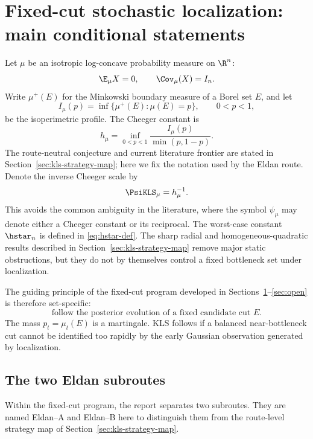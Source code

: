 \documentclass[../../main.tex]{subfiles}
\begin{document}
\section{Fixed-cut stochastic localization: main conditional statements}
\label{sec:introduction}

Let $\mu$ be an isotropic log-concave probability measure on $\R^n$:
\[
  \E_\mu X=0,\qquad \Cov_\mu(X)=I_n .
\]
Write $\mu^+(E)$ for the Minkowski boundary measure of a Borel set $E$, and let
\[
  I_\mu(p)=\inf\{\mu^+(E):\mu(E)=p\},\qquad 0<p<1,
\]
be the isoperimetric profile. The Cheeger constant is
\[
  h_\mu=\inf_{0<p<1}\frac{I_\mu(p)}{\min(p,1-p)}.
\]
The route-neutral conjecture and current literature frontier are stated in
Section~\ref{sec:kls-strategy-map}; here we fix the notation used by the Eldan route. Denote the
inverse Cheeger scale by
\[
  \PsiKLS_\mu=h_\mu^{-1}.
\]
This avoids the common ambiguity in the literature, where the symbol $\psi_\mu$ may denote either a
Cheeger constant or its reciprocal. The worst-case constant $\hstar_n$ is defined in
\eqref{eq:hstar-def}. The sharp radial and homogeneous-quadratic results described in
Section~\ref{sec:kls-strategy-map} remove major static obstructions, but they do not by themselves
control a fixed bottleneck set under localization.

The guiding principle of the fixed-cut program developed in
Sections~\ref{sec:introduction}--\ref{sec:open} is therefore set-specific:
\[
  \boxed{\text{follow the posterior evolution of a fixed candidate cut }E.}
\]
The mass $p_t=\mu_t(E)$ is a martingale. KLS follows if a balanced near-bottleneck cut cannot be
identified too rapidly by the early Gaussian observation generated by localization.

\subsection{The two Eldan subroutes}

Within the fixed-cut program, the report separates two subroutes. They are named Eldan--A and
Eldan--B here to distinguish them from the route-level strategy map of
Section~\ref{sec:kls-strategy-map}.
\end{document}

